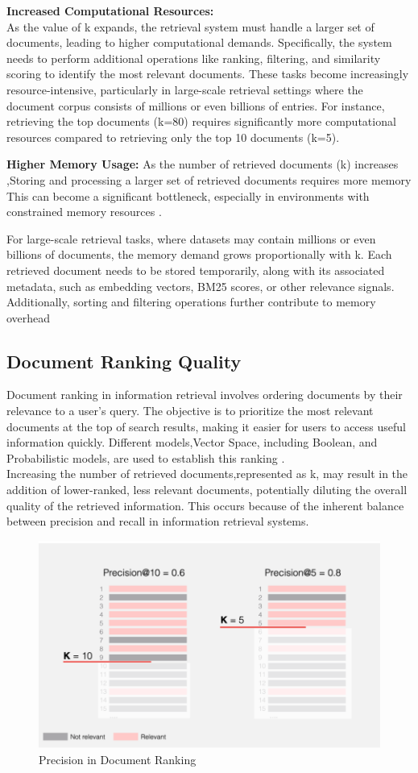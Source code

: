 \textbf{Increased Computational Resources:} \\
As the value of k expands, the retrieval system must handle a larger set of documents, leading to higher computational demands. Specifically, the system needs to perform additional operations like ranking, filtering, and similarity scoring to identify the most relevant documents. These tasks become increasingly resource-intensive, particularly in large-scale retrieval settings where the document corpus consists of millions or even billions of entries\cite{manning2008ir}. For instance, retrieving the top  documents (k=80) requires significantly more computational resources compared to retrieving only the top 10 documents (k=5). 

\textbf{Higher Memory Usage:}
As the number of retrieved documents (k) increases ,Storing and processing a larger set of retrieved documents requires more memory This can become a significant bottleneck, especially in environments with constrained memory resources .

For large-scale retrieval tasks, where datasets may contain millions or even billions of documents, the memory demand grows proportionally with 
k. Each retrieved document needs to be stored temporarily, along with its associated metadata, such as embedding vectors, BM25 scores, or other relevance signals. Additionally, sorting and filtering operations further contribute to memory overhead
\subsection{Document Ranking Quality}
Document ranking in information retrieval involves ordering documents by their relevance to a user's query. The objective is to prioritize the most relevant documents at the top of search results, making it easier for users to access useful information quickly. Different models,Vector Space, including Boolean, and Probabilistic models, are used to establish this ranking \cite{enwiki:1262179867}.\\

Increasing the number of retrieved documents,represented as k, may result in the addition of lower-ranked, less relevant documents, potentially diluting the overall quality of the retrieved information. This occurs because of the inherent balance between precision and recall in information retrieval systems.
\begin{figure}[h]
	\centering
	\includegraphics[width=0.7\linewidth]{Figures/precisionR.png}
	\caption{Precision in Document Ranking\cite{evidentlyai2025}}
	\label{precisionR}
	
\end{figure}

